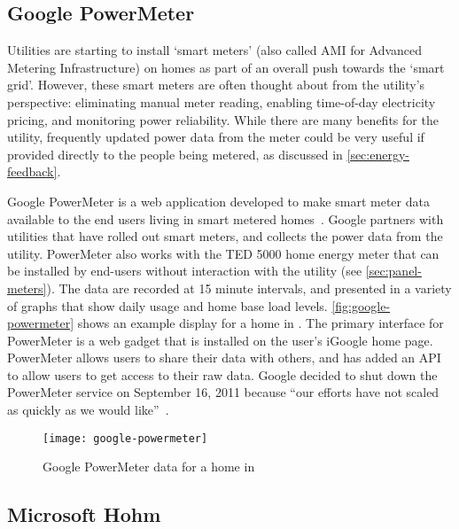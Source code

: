 \subsection{Google PowerMeter}
\label{sec:google-powermeter}

Utilities are starting to install `smart meters' (also called AMI for Advanced Metering Infrastructure) on homes as part of an overall push towards the `smart grid'. However, these smart meters are often thought about from the utility's perspective: eliminating manual meter reading, enabling time-of-day electricity pricing, and monitoring power reliability. While there are many benefits for the utility, frequently updated power data from the meter could be very useful if provided directly to the people being metered, as discussed in \autoref{sec:energy-feedback}.

Google PowerMeter is a web application developed to make smart meter data available to the end users living in smart metered homes~\cite{Google-PowerMeter}. Google partners with utilities that have rolled out smart meters, and collects the power data from the utility. PowerMeter also works with the TED 5000 home energy meter that can be installed by end-users without interaction with the utility (see \autoref{sec:panel-meters}). The data are recorded at 15 minute intervals, and presented in a variety of graphs that show daily usage and home base load levels. \autoref{fig:google-powermeter} shows an example display for a home in \Hawaii. The primary interface for PowerMeter is a web gadget that is installed on the user's iGoogle home page. PowerMeter allows users to share their data with others, and has added an API to allow users to get access to their raw data. Google decided to shut down the PowerMeter service on September 16, 2011 because ``our efforts have not scaled as quickly as we would like''~\cite{PowerMeter-shutdown}.

\begin{figure}[htbp]
	\centering
		\texttt{[image: google-powermeter]}
		\caption{Google PowerMeter data for a home in \Hawaii}
		\label{fig:google-powermeter}
\end{figure}

\subsection{Microsoft Hohm}


